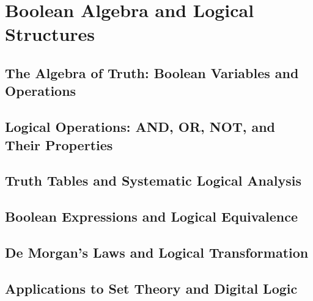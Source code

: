 

\chapter{Boolean Algebra and Logical Structures}

\section{The Algebra of Truth: Boolean Variables and Operations}

\section{Logical Operations: AND, OR, NOT, and Their Properties}

\section{Truth Tables and Systematic Logical Analysis}

\section{Boolean Expressions and Logical Equivalence}

\section{De Morgan's Laws and Logical Transformation}

\section{Applications to Set Theory and Digital Logic}
